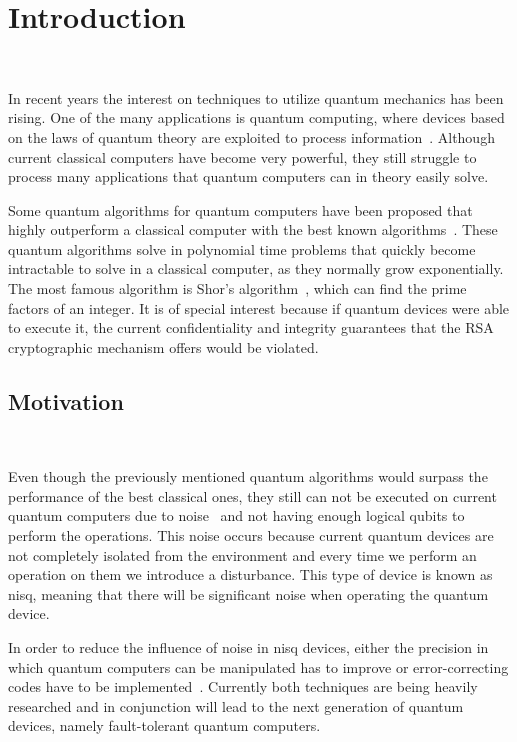 \chapter{Introduction}\label{chapter:introduction} \

In recent years the interest on techniques to utilize quantum mechanics has been rising.
One of the many applications is quantum computing, where devices based on the laws
of quantum theory are exploited to process information~\cite{national_academies_of_sciences_engineering_and_medicine_quantum_2019}.
Although current classical computers have become very powerful, they still struggle to
process many applications that quantum computers can in theory easily solve. \

Some quantum algorithms for quantum computers have been proposed that highly
outperform a classical computer with the best known algorithms~\cite{shor_polynomial-time_1997, van_dam_quantum_2006, hallgren_polynomial-time_2007}.
These quantum algorithms solve in polynomial time problems that quickly become
intractable to solve in a classical computer, as they normally grow exponentially.
The most famous algorithm is Shor's algorithm~\cite{shor_polynomial-time_1997}, which can find the prime factors
of an integer. It is of special interest because if quantum devices
were able to execute it, the current confidentiality and integrity guarantees
that the RSA~\cite{rivest_method_1978} cryptographic mechanism offers would be violated. \

\section{Motivation} \

Even though the previously mentioned quantum algorithms would surpass the performance
of the best classical ones, they still can not be executed on current quantum
computers due to noise~\cite{preskill_quantum_2018} and not having enough logical
qubits to perform the operations. This noise occurs because
current quantum devices are not completely isolated from the environment and every
time we perform an operation on them we introduce a disturbance. This type of device
is known as \ac{nisq}, meaning that there will be significant noise when operating
the quantum device. \

In order to reduce the influence of noise in \ac{nisq} devices, either the precision
in which quantum computers can be manipulated has to improve or error-correcting
codes have to be implemented~\cite{shor_quantum_nodate}. Currently both techniques are
being heavily researched and in conjunction will lead to the next generation of
quantum devices, namely fault-tolerant quantum computers. \

